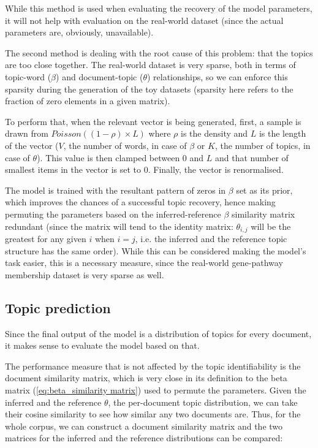 \documentclass[12pt,a4paper,twoside,openright]{report}
\begin{document}
While this method is used when evaluating the recovery of the model parameters, it will not help with evaluation on the real-world dataset (since the actual parameters are, obviously, unavailable).

The second method is dealing with the root cause of this problem: that the topics are too close together. The real-world dataset is very sparse, both in terms of topic-word ($\beta$) and document-topic ($\theta$) relationships, so we can enforce this sparsity during the generation of the toy datasets (sparsity here refers to the fraction of zero elements in a given matrix).

To perform that, when the relevant vector is being generated, first, a sample is drawn from $\mathit{Poisson}((1-\rho) \times L)$ where $\rho$ is the density and $L$ is the length of the vector ($V$, the number of words, in case of $\beta$ or $K$, the number of topics, in case of $\theta$). This value is then clamped between 0 and $L$ and that number of smallest items in the vector is set to 0. Finally, the vector is renormalised.

The model is trained with the resultant pattern of zeros in $\beta$ set as its prior, which improves the chances of a successful topic recovery, hence making permuting the parameters based on the inferred-reference $\beta$ similarity matrix redundant (since the matrix will tend to the identity matrix: $\theta_{i, j}$ will be the greatest for any given $i$ when $i = j$, i.e. the inferred and the reference topic structure has the same order). While this can be considered making the model's task easier, this is a necessary measure, since the real-world gene-pathway membership dataset is very sparse as well.

\subsection{Topic prediction}

Since the final output of the model is a distribution of topics for every document, it makes sense to evaluate the model based on that.

The performance measure that is not affected by the topic identifiability is the document similarity matrix, which is very close in its definition to the beta matrix (\ref{eq:beta_similarity matrix}) used to permute the parameters. Given the inferred and the reference $\theta$, the per-document topic distribution, we can take their cosine similarity to see how similar any two documents are. Thus, for the whole corpus, we can construct a document similarity matrix and the two matrices for the inferred and the reference distributions can be compared:
\end{document}
